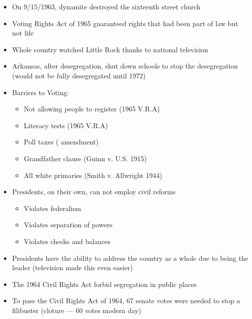 \documentclass[12pt]{article}
\begin{document}
\begin{itemize}
  \item On 9/15/1963, dynamite destroyed the sixteenth street church

  \item Voting Rights Act of 1965 guaranteed rights that had been part of law but not life

  \item Whole country watched Little Rock thanks to national television

  \item Arkansas, after desegregation, shut down schools to stop the desegregation (would not be fully desegregated until 1972)

    \newpage

  \item Barriers to Voting:

    \begin{itemize}

      \item Not allowing people to register (1965 V.R.A)

      \item Literacy tests (1965 V.R.A)

      \item Poll taxes ( amendment)

      \item Grandfather clause (Guinn v. U.S. 1915)

      \item All white primaries (Smith v. Allwright 1944)

    \end{itemize}

  \item Presidents, on their own, can not employ civil reforms

    \begin{itemize}

      \item Violates federalism

      \item Violates separation of powers

      \item Violates checks and balances

    \end{itemize}

  \item Presidents have the ability to address the country as a whole due to being the leader (television made this even easier)

  \item The 1964 Civil Rights Act forbid segregation in public places

  \item To pass the Civil Rights Act of 1964, 67 senate votes were needed to stop a filibuster (cloture — 60 votes modern day)

\end{itemize}
\end{document}
